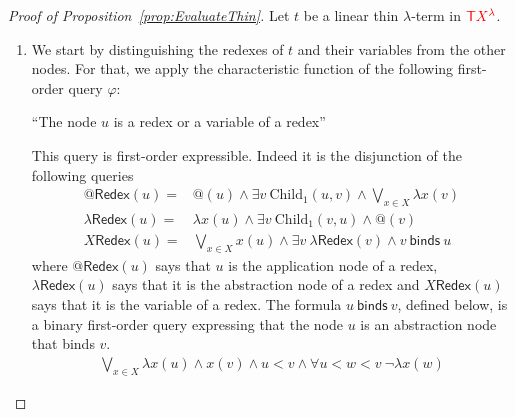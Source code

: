 \begin{proof}[Proof of Proposition~\ref{prop:EvaluateThin}] Let $t$ be a linear thin $\lambda$-term in ${\color{red}{\mathsf T}} {\color{red}{{X}^{{\color{red}{\lambda}}}}}$.




\begin{enumerate}
\item
We start by distinguishing the redexes of $t$ and their variables from the other nodes. For that, we apply the characteristic function of the following first-order query $\varphi$:
    \begin{center}
    ``The node $u$ is a redex or a variable of a redex''
    \end{center}
    This query is first-order expressible. Indeed it is the disjunction of the following queries
$$\begin{array}{rl}
@\mathsf{Redex}(u) = & @(u) \wedge \exists v \ \mathrm{Child}_1(u,v) \wedge \bigvee_{x\in X}\lambda x(v)\\[8pt]
\lambda\mathsf{Redex}(u)=& \lambda x(u) \wedge \exists v \ \mathrm{Child}_1(v,u) \wedge @(v) \\[8pt]
X\mathsf{Redex}(u) = &\bigvee_{x\in X} x(u) \wedge \exists v\ \lambda\mathsf{Redex}(v) \wedge v\ \mathsf{binds}\ u
\end{array}$$
where $@\mathsf{Redex}(u)$ says that $u$ is the application node of a redex, $\lambda\mathsf{Redex}(u)$ says that it is the abstraction node of a redex and $X\mathsf{Redex}(u)$ says that it is the variable of a redex. 
The formula $u\ \mathsf{binds}\ v$, defined below,  is a binary first-order query expressing that the node $u$ is an abstraction node that binds $v$.
 \begin{align*}
 \bigvee_{x\in X} \lambda x(u) \wedge x(v) \wedge u<v\wedge \forall u<w<v\ \neg \lambda x(w)
 \end{align*}


\end{enumerate}
\end{proof}
